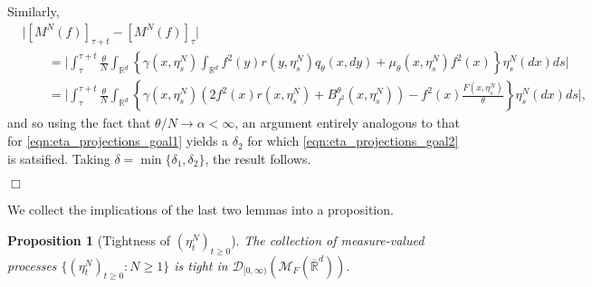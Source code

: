 \documentclass[12pt]{article}
\newenvironment {proof}{{\noindent\bf Proof }}{\hfill $\Box$ \medskip}
\newtheorem{proposition}[theorem]{Proposition}
\newcommand{\IR}{\mathbb R}
\newcommand{\cmeasures}{\mathcal{M}_F(\overline{\IR}^d)} %
\numberwithin{equation}{section}
\begin{document}
\begin{proof}
Similarly,
\begin{align*}
    &
 \big|   [M^{N}(f)]_{\tau + t} 
        - [M^{N}(f)]_\tau \big|
    \\ & \qquad =
  \Big|  \int_{\tau}^{\tau + t}
        \frac{\theta}{N}
        \int_{\IR^d}
        \left\{
            \gamma(x, \eta^N_s)
            \int_{\IR^d} f^2(y) r(y, \eta^N_s) q_\theta(x, dy)
            +
            \mu_\theta(x, \eta^N_s) f^2(x)
        \right\}
        \eta^N_s(dx)
    ds \Big|
    \\ & \qquad =
   \Big| \int_{\tau}^{\tau + t}
        \frac{\theta}{N}
        \int_{\IR^d}
        \left\{
            \gamma(x, \eta^N_s)
            \left(
                2 f^2(x) r(x, \eta^N_s)
                +
                B^\theta_{f^2}(x, \eta^N_s)
            \right)
            -
            f^2(x) \frac{F(x, \eta^N_s)}{ \theta}
        \right\}
        \eta^N_s(dx)
    ds\Big| ,
\end{align*}
and so using the fact that $\theta/N \to \alpha < \infty$,
an argument entirely analogous to 
that for \eqref{eqn:eta_projections_goal1}
yields a $\delta_2$ for which \eqref{eqn:eta_projections_goal2} is
satsified. Taking $\delta=\min\{\delta_1,\delta_2\}$, the result follows.

\end{proof}


We collect the implications of the last two lemmas into a proposition.

\begin{proposition}[Tightness of $(\eta^{N}_t)_{t \geq 0}$]
\label{tightness in one point compactification}
    The collection of measure-valued processes 
    $\{(\eta^{N}_t)_{t \geq 0}: N \geq 1\}$
    is tight in $\mathcal{D}_{[0,\infty)}(\cmeasures)$.
\end{proposition}
\end{document}
